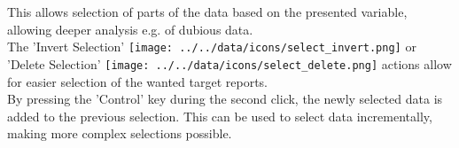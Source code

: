 This allows selection of parts of the data based on the presented variable, allowing deeper analysis e.g. of dubious data. \\

The 'Invert Selection' \texttt{[image: ../../data/icons/select\_invert.png]} or 'Delete Selection' \texttt{[image: ../../data/icons/select\_delete.png]} actions allow for easier selection of the wanted target reports. \\

By pressing the 'Control' key during the second click, the newly selected data is added to the previous selection. This can be used to select data incrementally, making more complex selections possible.
